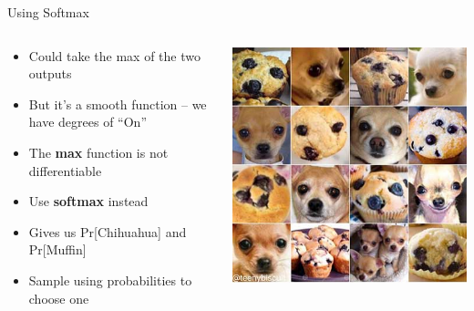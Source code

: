 \documentclass[aspectratio=169]{beamer}
\begin{document}
\begin{frame}{Using Softmax}

\begin{columns}
\begin{column}{0.6\textwidth}
\begin{itemize}
	\item Could take the max of the two outputs
	\item But it's a smooth function -- we have degrees of ``On''
	\item The \textbf{max} function is not differentiable
	\item Use \textbf{softmax} instead 
	\item Gives us Pr[Chihuahua] and Pr[Muffin]
	\item Sample using probabilities to choose one 
\end{itemize}

\end{column}
\begin{column}{0.4\textwidth}
\includegraphics[width=1\textwidth]{lectFF/dogOrMuffin.jpeg}
\end{column}
\end{columns}
	\end{frame}
\end{document}

